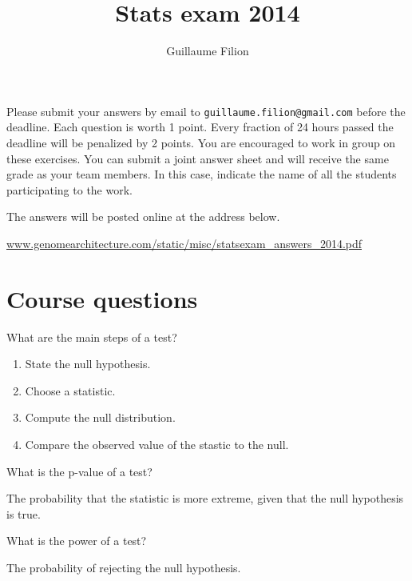 \documentclass[12pt]{article}
\title{Stats exam 2014}
\author{Guillaume Filion}
\begin{document}
\maketitle

Please submit your answers by email to
\texttt{guillaume.filion@gmail.com} before the deadline. Each
question is worth 1 point. Every fraction of 24 hours passed
the deadline will be penalized by 2 points. You are encouraged
to work in group on these exercises.
You can submit a joint answer sheet and will receive the same
grade as your team members. In this case, indicate the name of
all the students participating to the work.

The answers will be posted online at the address below. \par
\noindent \url{www.genomearchitecture.com/static/misc/statsexam_answers_2014.pdf}

\section{Course questions}

\begin{Exercise}[label={exo1}]
  What are the main steps of a test?
\end{Exercise}
\begin{Answer}[ref={exo1}]
  \begin{enumerate}
    \item State the null hypothesis.
    \item Choose a statistic.
    \item Compute the null distribution.
    \item Compare the observed value of the stastic to the null.
  \end{enumerate}
\end{Answer}

\begin{Exercise}[label={exo2}]
  What is the p-value of a test?
\end{Exercise}
\begin{Answer}[ref={exo2}]
  The probability that the statistic is more extreme, given that
  the null hypothesis is true.
\end{Answer}

\begin{Exercise}[label={exo3}]
  What is the power of a test?
\end{Exercise}
\begin{Answer}[ref={exo3}]
  The probability of rejecting the null hypothesis.
\end{Answer}
\end{document}
